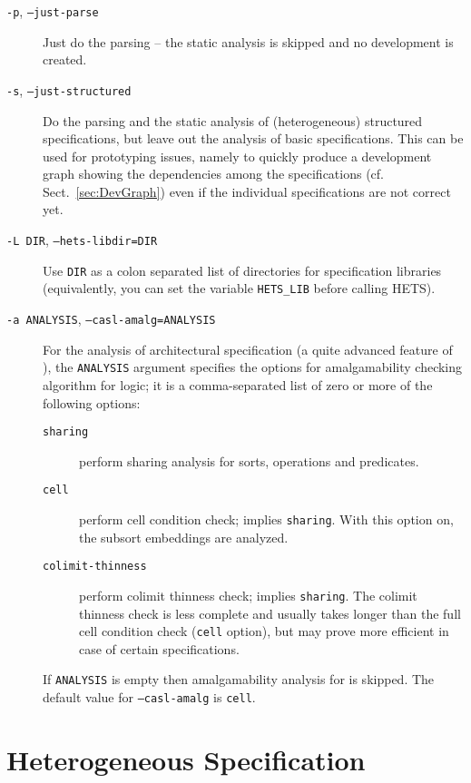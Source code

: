 \documentclass{article}
\newcommand{\normalTEXTSC}[2]{{#1\scriptsize#2}}
\newcommand     {\Hets}{\normalTEXTSC{H}{ETS}\xspace}
\begin{document}
\begin{description}
\item[\texttt{-p}, \texttt{--just-parse}] Just do the parsing
 -- the static analysis is skipped and no development is created.
\item[\texttt{-s}, \texttt{--just-structured}] Do the parsing and the
  static analysis of (heterogeneous) structured specifications, but
  leave out the analysis of basic specifications.  This can be used
  for prototyping issues, namely to quickly produce a development graph
  showing the dependencies among the specifications (cf.
  Sect.~\ref{sec:DevGraph}) even if the individual specifications are
  not correct yet.
\item[\texttt{-L DIR}, \texttt{--hets-libdir=DIR}]
Use \texttt{DIR} as a colon separated list of directories for specification libraries (equivalently, you can set the variable \texttt{HETS\_LIB} before
calling \Hets).
\item[\texttt{-a ANALYSIS}, \texttt{--casl-amalg=ANALYSIS}]
  For the analysis of architectural specification (a quite advanced
  feature of \CASL), the \texttt{ANALYSIS} argument specifies the options for
  amalgamability checking
  algorithm for \CASL logic; it is a comma-separated list of zero or
  more of the following options:
  \begin{description}
  \item[\texttt{sharing}] perform sharing analysis for sorts,
    operations and predicates.
  \item[\texttt{cell}] perform cell condition check; implies
    \texttt{sharing}. With this option on, the subsort embeddings are
    analyzed.
  \item[\texttt{colimit-thinness}] perform colimit thinness check;
    implies \texttt{sharing}. The colimit thinness check is less
    complete and usually takes longer than the full cell condition
    check (\texttt{cell} option), but may prove more efficient in case
    of certain specifications.
  \end{description}
  If \texttt{ANALYSIS} is empty then amalgamability analysis for
  \CASL is skipped.
  The default value for \texttt{--casl-amalg} is
  \texttt{cell}.
\end{description}

\section{Heterogeneous Specification} \label{sec:HetSpec}
\end{document}
